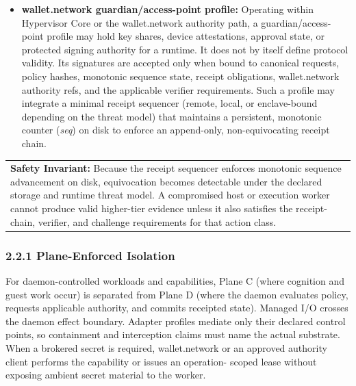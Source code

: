 \documentclass[
  11pt,
]{article}
\begin{document}
\begin{itemize}
\begin{itemize}
    non-interchangeable claims under their declared threat models. A TEE is
    one admissible private-execution substrate among several.
  \item
    \emph{Cryptographic Operator Runtime:} A proof-carrying runtime that
    uses FHE, MPC, ZK proofs, verifiable computation, or a hybrid
    construction to produce externally verifiable evidence without
    treating hardware attestation as the root of validity.
  \end{itemize}
\item
  \textbf{wallet.network guardian/access-point profile:} Operating within
  Hypervisor Core or the wallet.network authority path, a guardian/access-point profile
  may hold key shares, device attestations, approval state, or protected
  signing authority for a runtime. It does not by itself define protocol
  validity. Its signatures are accepted only when bound to canonical
  requests, policy hashes, monotonic sequence state, receipt obligations,
  wallet.network authority refs, and the applicable verifier
  requirements. Such a profile may integrate a minimal receipt sequencer
  (remote, local, or enclave-bound depending on the threat model) that
  maintains a persistent, monotonic counter (\emph{seq}) on disk to
  enforce an append-only, non-equivocating receipt chain.
\end{itemize}

\begin{longtable}[]{@{}>{\raggedright\arraybackslash}p{\linewidth}@{}}
\toprule\noalign{}
 \\
\midrule\noalign{}
\endhead
\bottomrule\noalign{}
\endlastfoot
\textbf{Safety Invariant:}\emph{\textbf{ }}Because the receipt
sequencer enforces monotonic sequence advancement on disk, equivocation
becomes detectable under the declared storage and runtime threat model.
A compromised host or execution worker cannot produce valid higher-tier
evidence unless it also satisfies the receipt-chain, verifier, and
challenge requirements for that action class. \\
\end{longtable}

\hypertarget{plane-enforced-isolation}{%
\subsubsection{2.2.1 Plane-Enforced
Isolation}\label{plane-enforced-isolation}}

For daemon-controlled workloads and capabilities, Plane C (where cognition
and guest work occur) is separated from Plane D (where the daemon evaluates
policy, requests applicable authority, and commits receipted state). Managed
I/O crosses the daemon effect boundary. Adapter profiles mediate only their
declared control points, so containment and interception claims must name the
actual substrate. When a brokered secret is required, wallet.network or an
approved authority client performs the capability or issues an operation-
scoped lease without exposing ambient secret material to the worker.
\end{document}
